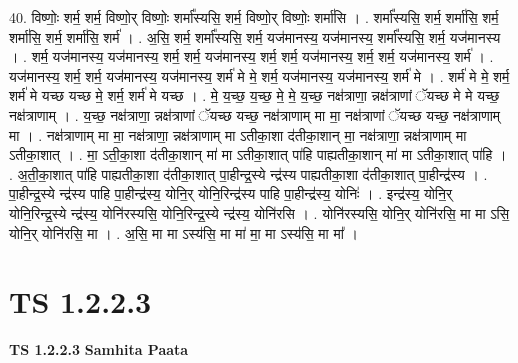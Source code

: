 \documentclass[17pt]{extarticle}
\begin{document}
40. विष्णोः॒ शर्म॒ शर्म॒ विष्णो॒र् विष्णोः॒ शर्मा᳚स्यसि॒ शर्म॒ विष्णो॒र् विष्णोः॒ शर्मा॑सि । . शर्मा᳚स्यसि॒ शर्म॒ शर्मा॑सि॒ शर्म॒ शर्मा॑सि॒ शर्म॒ शर्मा॑सि॒ शर्म॑ । . अ॒सि॒ शर्म॒ शर्मा᳚स्यसि॒ शर्म॒ यज॑मानस्य॒ यज॑मानस्य॒ शर्मा᳚स्यसि॒ शर्म॒ यज॑मानस्य । . शर्म॒ यज॑मानस्य॒ यज॑मानस्य॒ शर्म॒ शर्म॒ यज॑मानस्य॒ शर्म॒ शर्म॒ यज॑मानस्य॒ शर्म॒ शर्म॒ यज॑मानस्य॒ शर्म॑ । . यज॑मानस्य॒ शर्म॒ शर्म॒ यज॑मानस्य॒ यज॑मानस्य॒ शर्म॑ मे मे॒ शर्म॒ यज॑मानस्य॒ यज॑मानस्य॒ शर्म॑ मे । . शर्म॑ मे मे॒ शर्म॒ शर्म॑ मे यच्छ यच्छ मे॒ शर्म॒ शर्म॑ मे यच्छ । . मे॒ य॒च्छ॒ य॒च्छ॒ मे॒ मे॒ य॒च्छ॒ नक्ष॑त्राणा॒ न्नक्ष॑त्राणां ॅयच्छ मे मे यच्छ॒ नक्ष॑त्राणाम् । . य॒च्छ॒ नक्ष॑त्राणा॒ न्नक्ष॑त्राणां ॅयच्छ यच्छ॒ नक्ष॑त्राणाम् मा मा॒ नक्ष॑त्राणां ॅयच्छ यच्छ॒ नक्ष॑त्राणाम् मा । . नक्ष॑त्राणाम् मा मा॒ नक्ष॑त्राणा॒ न्नक्ष॑त्राणाम् मा ऽतीका॒शा द॑तीका॒शान् मा॒ नक्ष॑त्राणा॒ न्नक्ष॑त्राणाम् मा ऽतीका॒शात् । . मा॒ ऽती॒का॒शा द॑तीका॒शान् मा॑ मा ऽतीका॒शात् पा॑हि पाह्यतीका॒शान् मा॑ मा ऽतीका॒शात् पा॑हि । . अ॒ती॒का॒शात् पा॑हि पाह्यतीका॒शा द॑तीका॒शात् पा॒हीन्द्र॒स्ये न्द्र॑स्य पाह्यतीका॒शा द॑तीका॒शात् पा॒हीन्द्र॑स्य । . पा॒हीन्द्र॒स्ये न्द्र॑स्य पाहि पा॒हीन्द्र॑स्य॒ योनि॒र् योनि॒रिन्द्र॑स्य पाहि पा॒हीन्द्र॑स्य॒ योनिः॑ । . इन्द्र॑स्य॒ योनि॒र् योनि॒रिन्द्र॒स्ये न्द्र॑स्य॒ योनि॑रस्यसि॒ योनि॒रिन्द्र॒स्ये न्द्र॑स्य॒ योनि॑रसि । . योनि॑रस्यसि॒ योनि॒र् योनि॑रसि॒ मा मा ऽसि॒ योनि॒र् योनि॑रसि॒ मा । . अ॒सि॒ मा मा ऽस्य॑सि॒ मा मा॑ मा॒ मा ऽस्य॑सि॒ मा मा᳚ । \newline
\pagebreak
{}
\section*{ TS 1.2.2.3 }

\textbf{TS 1.2.2.3 } \newline
\textbf{Samhita Paata} \newline
\end{document}
